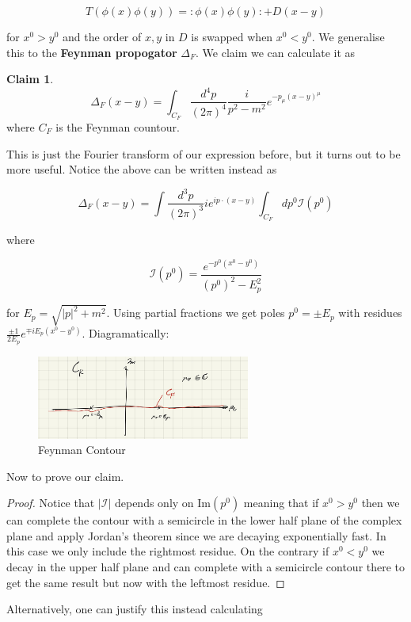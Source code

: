 \documentclass{article}
\theoremstyle{definition}
\newtheorem{claim}{Claim}
\begin{document}
$$ T(\phi(x)\phi(y)) = : \phi(x) \phi(y) : + D(x - y) $$

for $x^0 > y^0$ and the order of $x, y$ in $D$ is swapped when $x^0 < y^0$. We
generalise this to the \textbf{Feynman propogator} $\Delta_F$. We claim we can
calculate it as

\begin{claim}
$$ \Delta_F(x - y) = \int_{C_F} \frac{d^4p}{(2\pi)^4} \frac{i}{p^2 - m^2}
e^{-p_\mu (x - y)^\mu} $$
where $C_F$ is the Feynman countour.
\end{claim}

This is just the Fourier transform of our expression before, but it turns out to
be more useful. Notice the above can be written instead as

$$ \Delta_F (x - y) = \int \frac{d^3p}{(2\pi)^3} ie^{ip \cdot (x - y)}
\int_{C_F} dp^0 \mathcal{I}(p^0) $$

where

$$ \mathcal{I}(p^0) = \frac{e^{-p^0 (x^0 - y^0)}}{(p^0)^2 - E^2_p} $$

for $E_p = \sqrt{|p|^2 + m^2}$. Using partial fractions we get poles $p^0 = \pm
E_p$ with residues $\frac{\pm 1}{2E_p} e^{\mp i E_p (x^0 - y^0)}$.
Diagramatically:

\begin{figure}[H]
\centering
\includegraphics[width=7cm]{res/QFT/Feynman_contour}
\caption{Feynman Contour}
\label{feynman_contour}
\end{figure}

Now to prove our claim.

\begin{proof}
Notice that $|\mathcal{I}|$ depends only on $\text{Im}(p^0)$ meaning that if
$x^0 > y^0$ then we can complete the contour with a semicircle in the lower half
plane of the complex plane and apply Jordan's theorem since we are decaying
exponentially fast. In this case we only include the rightmost residue. On the
contrary if $x^0 < y^0$ we decay in the upper half plane and can complete with a
semicircle contour there to get the same result but now with the leftmost residue.
\end{proof}

Alternatively, one can justify this instead calculating
\end{document}
